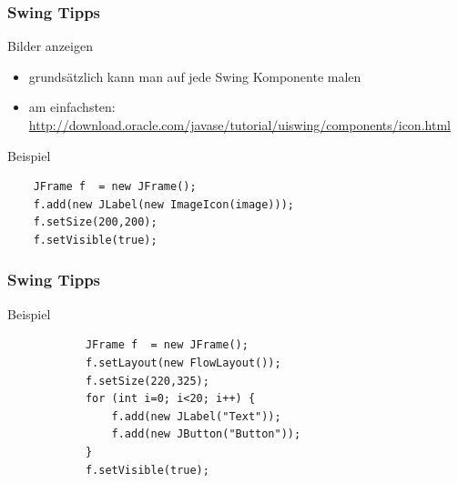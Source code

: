 \begin{frame}[fragile]
\frametitle{Swing Tipps}
\begin{block}{Bilder anzeigen}
\begin{itemize}
\item grundsätzlich kann man auf jede Swing Komponente malen \pause
\item am einfachsten: \url{http://download.oracle.com/javase/tutorial/uiswing/components/icon.html}  \pause
\end{itemize}
\end{block}

\begin{block}{Beispiel}
\begin{lstlisting}
	JFrame f  = new JFrame();
	f.add(new JLabel(new ImageIcon(image)));
	f.setSize(200,200);
	f.setVisible(true);
\end{lstlisting}
\end{block}
\end{frame}

\begin{frame}[fragile]
\frametitle{Swing Tipps}
\begin{block}{Beispiel}
\begin{lstlisting}
			JFrame f  = new JFrame();
			f.setLayout(new FlowLayout());
			f.setSize(220,325);
			for (int i=0; i<20; i++) {
				f.add(new JLabel("Text"));
				f.add(new JButton("Button"));
			}
			f.setVisible(true);\end{lstlisting}
\end{block}
\end{frame}

